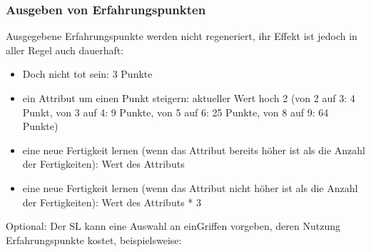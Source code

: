  

\subsubsection{Ausgeben von Erfahrungspunkten}

Ausgegebene Erfahrungspunkte werden nicht regeneriert, ihr Effekt ist jedoch in aller Regel auch dauerhaft:
\begin{itemize}
\item Doch nicht tot sein: 3 Punkte
\item ein Attribut um einen Punkt steigern: aktueller Wert hoch 2 (von 2 auf 3: 4 Punkt, von 3 auf 4: 9 Punkte, von 5 auf 6: 25 Punkte, von 8 auf 9: 64 Punkte)
\item eine neue Fertigkeit lernen (wenn das Attribut bereits höher ist als die Anzahl der Fertigkeiten): Wert des Attributs
\item eine neue Fertigkeit lernen (wenn das Attribut nicht höher ist als die Anzahl der Fertigkeiten): Wert des Attributs * 3
\end{itemize}
 

Optional: Der SL kann eine Auswahl an einGriffen vorgeben, deren Nutzung Erfahrungspunkte kostet, beispielsweise:

 
